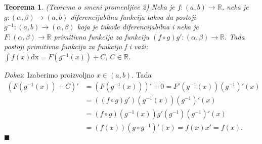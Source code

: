 \documentclass{article}
\newtheorem{teorema}{Teorema}[section]
\begin{document}
\begin{teoremabox}
    \label{teorema_1.3}
    \begin{teorema}
        (Teorema o smeni promenljive 2)
        Neka je $f:\left(a, b\right) \longrightarrow \mathbb{R}$, neka je
        $g:\left(\alpha, \beta\right) \longrightarrow \left(a, b\right)$
        diferencijabilna funkcija takva da postoji
        $g^{-1}:\left(a,b\right) \longrightarrow \left(\alpha, \beta\right)$
        koja je takođe diferencijabilna i neka je \\
        $F:\left(\alpha, \beta\right) \longrightarrow \mathbb{R}$
        primitivna funkcija za funkciju
        $\left(f\circ g\right) g' : \left(\alpha, \beta\right) \longrightarrow \mathbb{R}$.
        Tada postoji primitivna funkcija za funkciju f i važi:
        $\displaystyle\int f\left(x\right) \text{dx} = F\left(g^{-1}\left(x\right)\right) + C,\ C \in \mathbb{R}$.
    \end{teorema}
\end{teoremabox}

\textit{Dokaz}: Izaberimo proizvoljno $x \in \left(a, b\right)$. Tada
\begin{align*}
    \left(F\left(g^{-1}\left(x\right)\right) + C\right)' & = \left(F\left(g^{-1}\left(x\right)\right)\right)' + 0 = F'\left(g^{-1}\left(x\right)\right) \left(g^{-1}\right)'\left(x\right)                                                                                                                                                      \\
                                                         & = \left(\left(f\circ g\right) g'\right)\left(g^{-1}\left(x\right)\right) \left(g^{-1}\right)'\left(x\right)                                                                                                                                                                          \\
                                                         & = \left(f\circ g\right)\left(g^{-1}\left(x\right)\right) g'\left(g^{-1}\right) \left(g^{-1}\right)'\left(x\right)                                                                                                                                                                    \\
                                                         & = \left(f\left(x\right)\right) \left(g \circ g^{-1}\right)'\left(x\right)                                                        = f\left(x\right) x'                                                                                                             = f\left(x\right).
\end{align*}
\null\hfill $\blacksquare$\par
\end{document}
